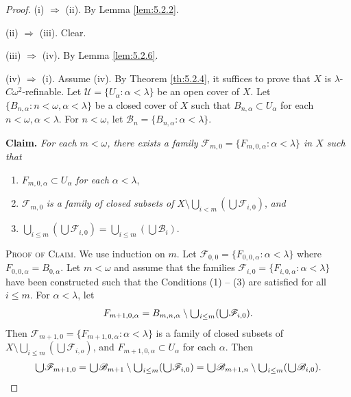 \documentclass[jisng5i.tex]{subfiles}
\begin{document}
\begin{proof}
(i) \(\Rightarrow\) (ii). By Lemma \ref{lem:5.2.2}.
			
(ii) \(\Rightarrow\) (iii). Clear.
			
(iii) \(\Rightarrow\) (iv). By Lemma \ref{lem:5.2.6}.
			
(iv) \(\Rightarrow\) (i). Assume (iv). By Theorem \ref{th:5.2.4}, it suffices to prove that \(X\) is 
\(\lambda\)-$C\omega^2$-refinable. 
Let \(\mathscr{U} = \{ U_\alpha: \alpha < \lambda \}\) be an open cover of \(X\). 
Let \(\{ B_{n,\alpha}: n < \omega, \alpha < \lambda \}\) be a closed cover of \(X\) 
such that \(B_{n,\alpha} \subset U_\alpha\) for each \(n < \omega, \alpha < \lambda\).
For \(n < \omega\), let \(\mathscr{B}_n = \{ B_{n,\alpha}: \alpha < \lambda \}\).
			
\textbf{Claim.} \textit{For each \(m < \omega\), there exists a family \(\mathscr{F}_{m,0} = \{ F_{m,0,\alpha}: \alpha < \lambda \}\) in $X$ such that}
\begin{enumerate}
\item[(1)] \(F_{m,0,\alpha} \subset U_\alpha\) \textit {for each } \(\alpha < \lambda\),
\item[(2)] \(\mathscr{F}_{m,0}\) 
\textit{ is a family of closed subsets of } \(X\setminus\bigcup_{i<m}(\bigcup\mathscr{F}_{i,0})\), \textit{ and }
\item[(3)] \(\bigcup_{i \le m} (\bigcup \mathscr{F}_{i,0}) = \bigcup_{i \le m} (\bigcup \mathscr{B}_i)\).
\end{enumerate}
\textsc{Proof of Claim}.
We use induction on $m$.
Let $\mathscr{F}_{0,0} = \{F_{0,0, \alpha}: \alpha < \lambda\}$ 
where $F_{0, 0, \alpha} = B_{0,\alpha}$. Let $m < \omega$ and assume that the families 
$\mathscr{F}_{i,0} = \{F_{i,0,\alpha}: \alpha < \lambda\}$ have been 
constructed such that the Conditions (1) -- (3) are satisfied for all $i \le m$. For $\alpha < \lambda$, let
$$F_{m+1,0,\alpha} = B_{m,n,\alpha} \setminus \raisebox{-2pt}{\scalebox{1.5}{$\cup$}}_{i \le m} (\raisebox{-2pt}{\scalebox{1.5}{$\cup$}} \mathscr{F}_{i,0}).$$
Then $\mathscr{F}_{m+1,0} = \{F_{m+1,0,\alpha}: \alpha < \lambda\}$ is a family of closed subsets of 
$X\setminus \bigcup_{i\le m}(\bigcup \mathscr{F}_{i, o})$, and $F_{m+1,0,\alpha} \subset U_\alpha$ for each $\alpha$. Then
$$\raisebox{-2pt}{\scalebox{1.5}{$\cup$}} \mathscr{F}_{m+1,0} = 
\raisebox{-2pt}{\scalebox{1.5}{$\cup$}} \mathscr{B}_{m+1} \setminus \raisebox{-2pt}{\scalebox{1.5}{$\cup$}}_{i \le m} (\raisebox{-2pt}{\scalebox{1.5}{$\cup$}} \mathscr{F}_{i,0}) = 
\raisebox{-2pt}{\scalebox{1.5}{$\cup$}} \mathscr{B}_{m+1,n} \setminus \raisebox{-2pt}{\scalebox{1.5}{$\cup$}}_{i \le m} (\raisebox{-2pt}{\scalebox{1.5}{$\cup$}} \mathscr{B}_{i,0}).$$

\end{proof}
\end{document}
